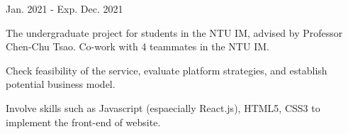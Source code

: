 \begin{cventries}
    {Jan. 2021 - Exp. Dec. 2021} %
    {
      \begin{cvitems} %
        \item {The undergraduate project for students in the NTU IM, advised by Professor Chen-Chu Tsao. Co-work with 4 teammates in the NTU IM.}
        \item {Check feasibility of the service, evaluate platform strategies, and establish potential business model.}
        \item {Involve skills such as Javascript (espaecially React.js), HTML5, CSS3 to implement the front-end of website.}
      \end{cvitems}
    }    

\end{cventries}
